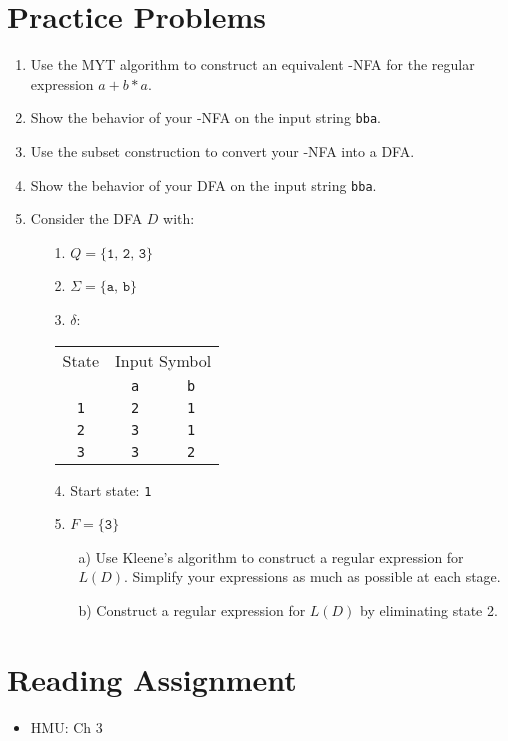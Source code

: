\documentclass[]{article}
\begin{document}
\section{Practice Problems}
  \begin{enumerate}
    \item Use the MYT algorithm to construct an equivalent \textepsilon-NFA for
    the regular expression $a + b * a$.
    \item Show the behavior of your \textepsilon-NFA on the input string
    \texttt{bba}.
    \item Use the subset construction to convert your \textepsilon-NFA into a
    DFA.
    \item Show the behavior of your DFA on the input string \texttt{bba}.
    \item Consider the DFA $D$ with:
      \begin{enumerate}
        \item[1.] $Q = \{\texttt{1, 2, 3}\}$
        \item[2.] $\Sigma = \{\texttt{a, b}\}$
        \item[3.] $\delta$: \\

          \begin{tabular}{|c|c|c|}
            \hline
            State      & \multicolumn{2}{|c|}{Input Symbol} \\ \cline{2-3}
                       & \texttt{a} & \texttt{b}            \\ \hline
            \texttt{1} & \texttt{2} & \texttt{1}            \\ \hline
            \texttt{2} & \texttt{3} & \texttt{1}            \\ \hline
            \texttt{3} & \texttt{3} & \texttt{2}            \\ \hline
          \end{tabular}

        \item[4.] Start state: \texttt{1}
        \item[5.] $F = \{\texttt{3}\}$
          \begin{enumerate}
            \item[a)] Use Kleene's algorithm to construct a regular expression
            for $L(D)$. Simplify your expressions as much as possible at each
            stage.
            \item[b)] Construct a regular expression for $L(D)$ by eliminating
            state 2.
          \end{enumerate}
      \end{enumerate}
  \end{enumerate}

\section{Reading Assignment}
  \begin{itemize}
    \item HMU: Ch 3
  \end{itemize}
\end{document}
